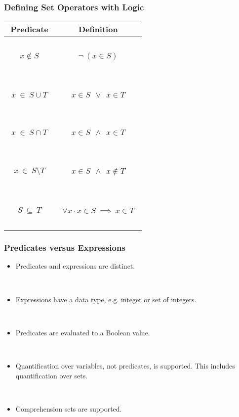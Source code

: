 \documentclass{beamer}
\begin{document}
\begin{frame}

\frametitle{Defining Set Operators with Logic}

\begin{center}
\begin{tabular}{|c|c|}
\hline
Predicate & Definition \\[2pt] \hline
~&\\
$x\not\in S$  &  $\lnot~(x\in S) $ \\
~&\\ \hline
~&\\
$~~x~\in~ S\cup T~~$  &  $~~x\in S  ~~\lor~~ x\in T~~$ \\
~&\\ \hline
~&\\
$x~\in~ S\cap T$  &  $x\in S  ~~\land~~ x\in T$ \\
~&\\ \hline
~&\\
$x~\in~ S\setminus T$  &  $x\in S  ~~\land~~ x\not\in T$ \\
~&\\ \hline
~&\\
$S~\subseteq~ T $  &  $~~\forall x \cdot x\in S  ~\implies~ x\in T~~$ \\
~&\\ \hline
\end{tabular}
\end{center}

\end{frame}

\begin{frame}
\frametitle{Predicates versus Expressions}

\begin{itemize}
\item Predicates and expressions are distinct.

~

\item Expressions have a data type, e.g. integer or set of integers.

~

\item Predicates are evaluated to a Boolean value.

~

\item Quantification over variables, not predicates, is supported. This includes quantification
over sets.

~

\item Comprehension sets are supported.
\end{itemize}
\end{frame}
\end{document}
